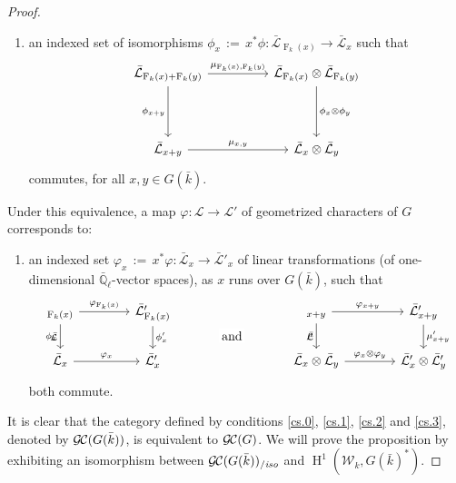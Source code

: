 \documentclass[11pt]{amsart}
\makeatletter
\theoremstyle{plain}
\theoremstyle{definition}
\theoremstyle{remark}
\newcommand{\EE}{\mathbb{\bar Q}_\ell}
\newcommand{\bFq}{\bar{k}}
\newcommand{\Fq}{k}
\newcommand{\Frob}[1]{{\operatorname{F}_{#1}}}
\DeclareMathOperator{\Hh}{H}
\newcommand{\cdef}[1]{{{\color{blue}#1}\index{#1}}}
\newcommand{\ceq}{{\, :=\, }}
\newcommand{\cs}[1]{{\mathcal{#1}}}
\newcommand{\gcs}[1]{{\mathcal{\bar #1}}}
\newcommand{\GC}{{\mathcal{G\hskip-0.8pt C}}}
\newcommand{\GCiso}[1]{\GC(#1)_{/\textit{iso}}}
\newcommand{\Weil}[1]{\mathcal{W}_{#1}}
\newcommand{\labitem}[2]{%
\def\@itemlabel{\textbf{#1}}
\item
\def\@currentlabel{#1}\label{#2}}
\newcommand{\tight}[3]{\hspace{-#1pt}{#2}\hspace{-#3pt}}
\makeatother
\begin{document}
\begin{proof}
\begin{enumerate}
  \labitem{(cs.2)}{cs.2} an indexed set of isomorphisms $\phi_{x} \ceq x^*\phi: \gcs{L}_{\Frob{\Fq}(x)} \to \gcs{L}_x$
    such that
    \[
    \begin{tikzcd}[row sep=40]
      \gcs{L}_{\Frob{\Fq}(x)+\Frob{\Fq}(y)} \arrow[swap]{d}{\phi_{x+y}} \arrow{rr}{\mu_{\Frob{\Fq}(x),\Frob{\Fq}(y)}}
      && \gcs{L}_{\Frob{\Fq}(x)}\otimes \gcs{L}_{\Frob{\Fq}(y)} \dar{\phi_x \tight{0}{\otimes}{0} \phi_y} \\
      \gcs{L}_{x+y} \arrow{rr}{\mu_{x,y}}
      && \gcs{L}_x \otimes\gcs{L}_y
    \end{tikzcd}
    \]
    commutes, for all $x,y\in G(\bFq)$.
  \end{enumerate}
  Under this equivalence, a map $\varphi : \cs{L} \to \cs{L'}$ of
  geometrized characters of $G$ corresponds to:
  \begin{enumerate}
  \labitem{(cs.3)}{cs.3} an indexed set $\varphi_x \ceq x^*\varphi: \gcs{L}_x \to \gcs{L'}_x$
    of linear transformations (of one-dimensional $\EE$-vector spaces),
    as $x$ runs over $G(\bFq)$, such that
    \[
    \begin{tikzcd}[column sep=40]
      \arrow[swap]{d}{\phi_x} \gcs{L}_{\Frob{\Fq}(x)} \rar{\varphi_{\Frob{\Fq}(x)}} & \gcs{L'}_{\Frob{\Fq}(x)} \dar{\phi_x'}
      &\arrow[draw=none]{d}[pos=.4,description]{\text{\normalsize{and}}}& \arrow[swap]{d}{\mu} \gcs{L}_{x+y} \rar{\varphi_{x+y}} & \gcs{L'}_{x+y} \dar{\mu'_{x+y}} \\
      \gcs{L}_x \rar{\varphi_x} & \gcs{L'}_x
      & {} & \gcs{L}_x\otimes\gcs{L}_y \rar{\varphi_x\otimes \varphi_y} & \gcs{L'}_x \otimes \gcs{L'}_y
    \end{tikzcd}
    \]
    both commute.
  \end{enumerate}
  It is clear that the category defined by conditions \ref{cs.0},
  \ref{cs.1}, \ref{cs.2} and \ref{cs.3}, denoted by
  \cdef{$\GC(G(\bFq))$}, is equivalent to $\GC(G)$. We will prove the
  proposition by exhibiting an isomorphism between
  $\GCiso{G(\bFq)}$ and $\Hh^1(\Weil{\Fq}, G(\bFq)^*)$.


\end{proof}
\end{document}

